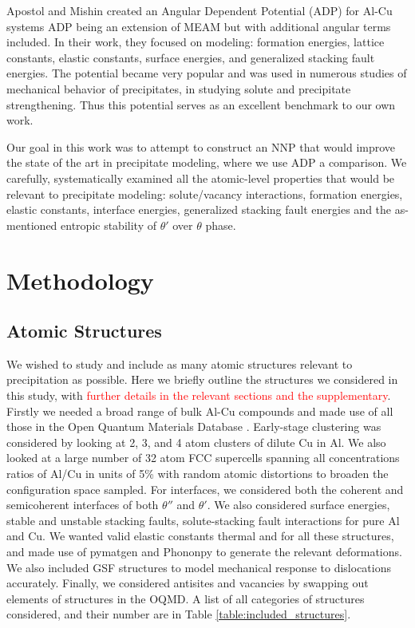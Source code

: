\documentclass{article}
\begin{document}
Apostol and Mishin created an Angular Dependent Potential (ADP) for Al-Cu systems\cite{Apostol2011} ADP being an extension of MEAM but with additional angular terms included.
In their work, they focused on modeling: formation energies, lattice constants, elastic constants, surface energies, and generalized stacking fault energies.
The potential became very popular and was used in numerous studies of mechanical behavior of precipitates,
in studying solute and precipitate strengthening\cite{Singh2013AnAlloy}\cite{Esteban-Manzanares2019}\cite{Wu2020AtomisticAlloys}. Thus this potential serves as an excellent benchmark to our own work. 

Our goal in this work was to attempt to construct an NNP that would improve the state of the art in precipitate modeling, where we use ADP a comparison.
We carefully, systematically examined all the atomic-level properties that would be relevant to precipitate modeling: solute/vacancy interactions, formation energies, elastic constants, interface energies, generalized stacking fault energies and the as-mentioned entropic stability of $\theta'$ over $\theta$ phase.


\section{Methodology}
\subsection{Atomic Structures}
We wished to study and include as many atomic structures relevant to precipitation as possible.
 Here we briefly outline the structures we considered in this study, with \textcolor{red}{further details in the relevant sections and the supplementary}.  
Firstly we needed a broad range of bulk Al-Cu compounds and made use of all those in the Open Quantum Materials Database \cite{Kirklin2015}.
Early-stage clustering was considered by looking at 2, 3, and 4 atom clusters of dilute Cu in Al. We also looked at a large number of 32 atom FCC supercells spanning all concentrations ratios of Al/Cu in units of 5\% 
with random atomic distortions to broaden the configuration space sampled.  For interfaces, we considered both the coherent and semicoherent interfaces of both $\theta''$ and $\theta'$.  We also considered surface energies,  stable and unstable stacking faults, solute-stacking fault interactions for pure Al and Cu.
We wanted valid elastic constants thermal and for all these structures, and made use of pymatgen\cite{Ong2013} and Phononpy\cite{Togo2015FirstScience} to generate the relevant deformations.
We also included GSF structures to model mechanical response to dislocations accurately. Finally, we considered
antisites and vacancies by swapping out elements of structures in the OQMD. A list of all categories of structures considered, and their number are in Table \ref{table:included_structures}.
\end{document}
